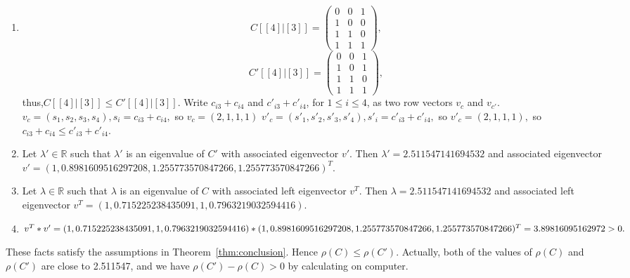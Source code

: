 \documentclass[12pt, a4paper]{article}
\theoremstyle{plain}
\theoremstyle{definition}
\begin{document}
    \begin{enumerate}[label=(\roman*)]
    \item 
    $$C[[4]|[3]]=\begin{pmatrix}
        0 & 0 & 1\\
        1 & 0 & 0\\
        1 & 1 & 0\\
        1 & 1 & 1
        \end{pmatrix},$$
    $$C'[[4]|[3]]=\begin{pmatrix}
        0 & 0 & 1\\
        1 & 0 & 1\\
        1 & 1 & 0\\
        1 & 1 & 1
        \end{pmatrix},$$
    thus,$C[[4]|[3]]\leq C'[[4]|[3]].$
    Write $c_{i3}+c_{i4}$ and $c'_{i3}+c'_{i4}$, for $1\leq i\leq 4$, as two row vectors $v_c$ and $v_{c'}$.
    $v_c = (s_1, s_2, s_3, s_4), s_i = c_{i3}+c_{i4},$ so $v_c = (2,1,1,1)$
    $v'_c = (s'_1, s'_2, s'_3, s'_4), s'_i = c'_{i3}+c'_{i4},$ so $v'_c = (2,1,1,1),$
    so $c_{i3}+c_{i4} \leq c'_{i3}+c'_{i4}.$
    \item 
    Let $\lambda'\in \mathbb{R}$ such that $\lambda'$ is an eigenvalue of $C'$ with associated eigenvector $v'$.
    Then $\lambda' = 2.511547141694532$ and associated eigenvector $v'=(1, 0.8981609516297208, 1.255773570847266, 1.255773570847266)^T$.
    \item 
    Let  $\lambda\in \mathbb{R}$ such that $\lambda$ is an eigenvalue of $C$ with associated left eigenvector $v^T$.
    Then $\lambda = 2.511547141694532$ and associated left eigenvector $v^T=(1, 0.715225238435091, 1, 0.7963219032594416)$.
    \item 
    $v^T * v' = (1, 0.715225238435091, 1, 0.7963219032594416) \\
    * (1, 0.8981609516297208, 1.255773570847266, 1.255773570847266)^T
    \\ = 3.89816095162972 >0.$

    \end{enumerate}
    
    These facts satisfy the assumptions in Theorem~\ref{thm:conclusion}. Hence $\rho(C)\leq\rho(C')$. Actually, both of
     the values of $\rho(C)$ and $\rho(C')$ are close to 2.511547, and we have $\rho(C')-\rho(C)>0$ by calculating on
     computer.\cite[sage]{sage}
\end{document}
